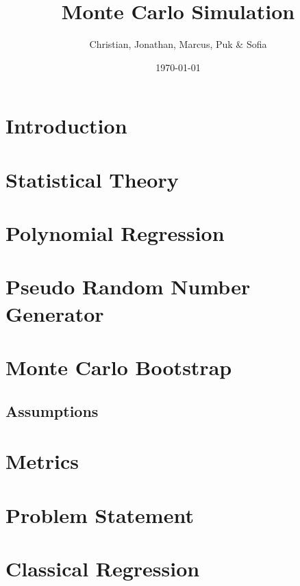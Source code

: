 \documentclass{article}
\title{Monte Carlo Simulation}
\author{Christian, Jonathan, Marcus, Puk \& Sofia }
\date{\today}
\begin{document}
	
	
	\setcounter{section}{0}
	\maketitle
	\newpage
	\tableofcontents
	\newpage
	
	\section{Introduction}
	
	\newpage
	
	\section{Statistical Theory}
	
	\newpage
	
	\section{Polynomial Regression}
 	
	\newpage
	
	
	\section{Pseudo Random Number Generator}
	
	\newpage
	
	\section{Monte Carlo Bootstrap}
	\subsection{Assumptions}
	\newpage
	\section{Metrics}
%	

	
	\section{Problem Statement}
	\newpage
%	
	\section{Classical Regression}
	\newpage
	
\end{document}
